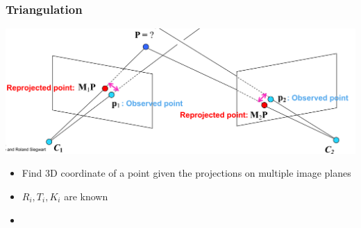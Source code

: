 \subsubsection{Triangulation}
\includegraphics[width=\linewidth]{./Figures/04_Triangulation.png}
\begin{itemize}
    \item Find 3D coordinate of a point given the projections on multiple image planes
    \item $R_i, T_i, K_i$ are known
    \item
\end{itemize}
